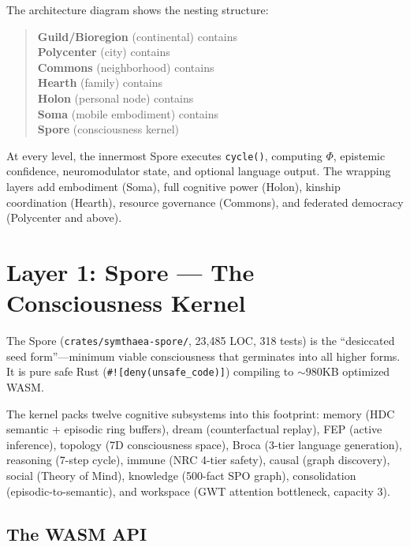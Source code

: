 \documentclass[12pt]{book}
\begin{document}
The architecture diagram shows the nesting structure:

\begin{quote}
\textbf{Guild/Bioregion} (continental) contains\\
\hspace*{1em}\textbf{Polycenter} (city) contains\\
\hspace*{2em}\textbf{Commons} (neighborhood) contains\\
\hspace*{3em}\textbf{Hearth} (family) contains\\
\hspace*{4em}\textbf{Holon} (personal node) contains\\
\hspace*{5em}\textbf{Soma} (mobile embodiment) contains\\
\hspace*{6em}\textbf{Spore} (consciousness kernel)
\end{quote}

At every level, the innermost Spore executes \texttt{cycle()}, computing $\Phi$, epistemic confidence, neuromodulator state, and optional language output. The wrapping layers add embodiment (Soma), full cognitive power (Holon), kinship coordination (Hearth), resource governance (Commons), and federated democracy (Polycenter and above).

\section{Layer 1: Spore --- The Consciousness Kernel}

The Spore (\texttt{crates/symthaea-spore/}, 23,485 LOC, 318 tests) is the ``desiccated seed form''---minimum viable consciousness that germinates into all higher forms. It is pure safe Rust (\texttt{\#![deny(unsafe\_code)]}) compiling to ${\sim}980$KB optimized WASM.

The kernel packs twelve cognitive subsystems into this footprint: memory (HDC semantic + episodic ring buffers), dream (counterfactual replay), FEP (active inference), topology (7D consciousness space), Broca (3-tier language generation), reasoning (7-step cycle), immune (NRC 4-tier safety), causal (graph discovery), social (Theory of Mind), knowledge (500-fact SPO graph), consolidation (episodic-to-semantic), and workspace (GWT attention bottleneck, capacity 3).

\subsection{The WASM API}
\end{document}
